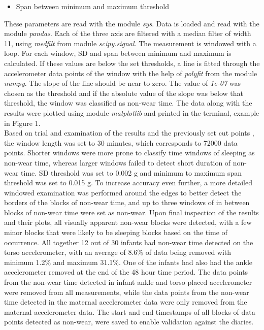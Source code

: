 \documentclass{article}
\begin{document}
{\begin{itemize}
\item Span between minimum and maximum threshold
\end{itemize}
These parameters are read with the module \textit{sys}. Data is loaded and read with the module \textit{pandas}. Each of the three axis are filtered with a median filter of width 11, using \textit{medfilt} from module \textit{scipy.signal}. The measurement is windowed with a loop. For each window, SD and span between minimum and maximum is calculated. If these values are below the set thresholds, a line is fitted through the accelerometer data points of the window with the help of \textit{polyfit} from the module \textit{numpy}. The slope of the line should be near to zero. The value of \textit{1e-07} was chosen as the threshold and if the absolute value of the slope was below that threshold, the window was classified as non-wear time. The data along with the results were plotted using module \textit{matplotlib} and printed in the terminal, example in Figure 1.\\
Based on trial and examination of the results and the previously set cut points \cite{ref2}, the window length was set to 30 minutes, which corresponds to 72000 data points. Shorter windows were more prone to classify time windows of sleeping as non-wear time, whereas larger windows failed to detect short duration of non-wear time. SD threshold was set to 0.002 g and minimum to maximum span threshold was set to 0.015 g. To increase accuracy even further, a more detailed windowed examination was performed around the edges to better detect the borders of the blocks of non-wear time, and up to three windows of in between blocks of non-wear time were set as non-wear. 
Upon final inspection of the results and their plots, all visually apparent non-wear blocks were detected, with a few minor blocks that were likely to be sleeping blocks based on the time of occurrence. All together 12 out of 30 infants had non-wear time detected on the torso accelerometer, with an average of 8.6\% of data being removed with minimum 1.2\% and maximum 31.1\%. One of the infants had also had the ankle accelerometer removed at the end of the 48 hour time period. The data points from the non-wear time detected in infant ankle and torso placed accelerometer were removed from all measurements, while the data points from the non-wear time detected in the maternal accelerometer data were only removed from the maternal accelerometer data. The start and end timestamps of all blocks of data points detected as non-wear, were saved to enable validation against the diaries. 

}
\end{document}
